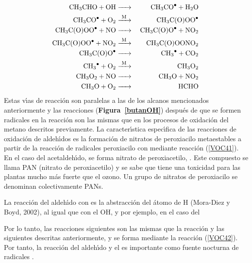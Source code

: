 \begin{eqnarray}
\ce{CH3CHO + OH       & -> & CH3CO^. + H2O \nonumber\\
 CH3CO^. + O2             & ->[M] & CH3C(O)OO^. \label{VOC41}\\
 CH3C(O)OO^. + NO     &  -> &  CH3C(O)O^.  + NO2 \nonumber\\
 CH3C(O)OO^.  + NO2   & ->[M] &  CH3C(O)OONO2  \nonumber\\
 CH3C(O)O^.                  & -> &  CH3^. + CO2  \nonumber\\
   CH3^. + O2                 & ->[M] & CH3O2   \nonumber\\
  CH3O2 + NO                & -> &  CH3O + NO2  \nonumber\\
   CH3O + O2                 & -> & HCHO  \label{VOC42} }
\end{eqnarray}
Estas v\'{\i}as de reacci\'on son paralelas a las de los alcanos mencionados anteriormente  y las reacciones (\textbf{Figura~\ref{butanOH}}) despu\'es de que se formen radicales  en la reacci\'on  son las mismas que en los procesos de oxidaci\'on del metano descritos previamente. La caracter\'{\i}stica espec\'{\i}fica de las reacciones de oxidaci\'on de aldeh\'{\i}dos es la formaci\'on de nitratos de peroxiacilo metaestables a partir de la reacci\'on de radicales peroxiacilo con  mediante reacci\'on (\ref{VOC41}). En el caso del acetaldeh\'{\i}do, se forma nitrato de peroxiacetilo, . Este compuesto se llama \gls{PAN} (nitrato de peroxiacetilo) y se sabe que tiene una toxicidad para las plantas mucho m\'as fuerte que el ozono. Un grupo de nitratos de peroxiacilo se denominan colectivamente PANs.

La reacci\'on del aldeh\'{\i}do con  es la abstracci\'on del \'atomo de H (Mora-Diez y Boyd, 2002), al igual que con el OH, y por ejemplo, en el caso del 

Por lo tanto, las reacciones siguientes son las mismas que la reacci\'on y las siguientes descritas anteriormente, y se forma  mediante la reacci\'on (\ref{VOC42}). Por tanto, la reacci\'on del aldeh\'{\i}do y el  es importante como fuente nocturna de radicales .


